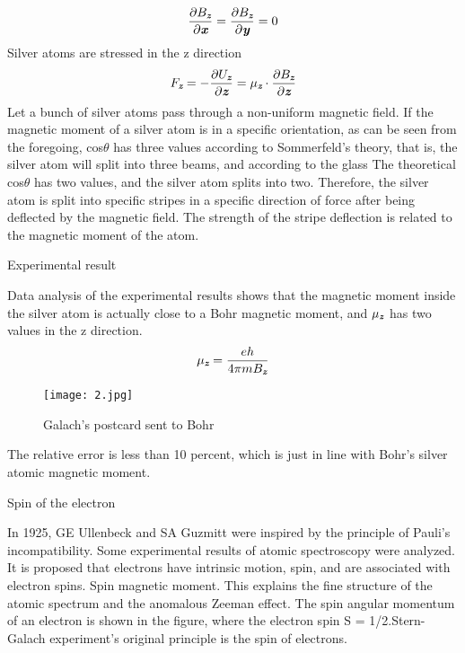 \documentclass[a4paper]{article}
\def\mathbi#1{\textbf{\em #1}}
\begin{document}
\begin{equation}
\frac{\partial\textbf{$B_{\mathbi{z}}$}}{\partial\textbf{$\mathbi{x}$}}=\frac{\partial\textbf{$B_{\mathbi{z}}$}}{\partial\textbf{$\mathbi{y}$}}=0
\end{equation}
    Silver atoms are stressed in the z direction
\begin{equation}
\textbf{$F_{\mathbi{z}}$}=-\frac{\partial\textbf{$U_{\mathbi{z}}$}}{\partial\textbf{$\mathbi{z}$}}=\textbf{$\mu_{\mathbi{z}}$}
\cdot\frac{\partial\textbf{$B_{\mathbi{z}}$}}{\partial\textbf{$\mathbi{z}$}}
\end{equation}
    Let a bunch of silver atoms pass through a non-uniform magnetic field. If the magnetic moment of a silver atom is in a specific orientation, as can be seen from the foregoing, cos$\theta$ has three values according to Sommerfeld's theory, that is, the silver atom will split into three beams, and according to the glass The theoretical cos$\theta$ has two values, and the silver atom splits into two. Therefore, the silver atom is split into specific stripes in a specific direction of force after being deflected by the magnetic field. The strength of the stripe deflection is related to the magnetic moment of the atom.
    
    Experimental result
    
    Data analysis of the experimental results shows that the magnetic moment inside the silver atom is actually close to a Bohr magnetic moment, and $\mu_{\mathbi{z}}$ has two values in the z direction.
\cite{Toennies2011Otto}
\begin{equation}   
\textbf{$\mu_{\mathbi{z}}$}=\frac{\textbf{$eh$}}{\textbf{$4{\pi}m{B_{\mathbi{z}}}$}}
\end{equation}

\begin{figure}[htbp!] \label{2}
\centering %
    \texttt{[image: 2.jpg]}
    \caption{Galach's postcard sent to Bohr}
\end{figure}
    The relative error is less than 10 percent, which is just in line with Bohr's silver atomic magnetic moment.
    
    
    Spin of the electron
    
    In 1925, GE Ullenbeck and SA Guzmitt were inspired by the principle of Pauli's incompatibility. Some experimental results of atomic spectroscopy were analyzed. It is proposed that electrons have intrinsic motion, spin, and are associated with electron spins. Spin magnetic moment. This explains the fine structure of the atomic spectrum and the anomalous Zeeman effect. The spin angular momentum of an electron is shown in the figure, where the electron spin S = 1/2.Stern-Galach experiment's original principle is the spin of electrons.
    
\end{document}
